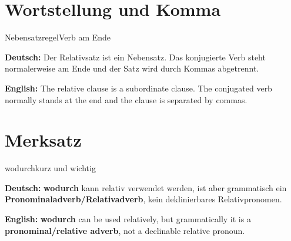 \documentclass[a4paper,11pt]{article}
\newcommand{\GermanText}[1]{\textbf{Deutsch: }#1\par}
\newcommand{\EnglishText}[1]{{\small\color{SoftGray}\textbf{English: }#1\par}}
\begin{document}
\section{Wortstellung und Komma}

\begin{grammarentry}{Nebensatzregel}{Verb am Ende}

\GermanText{Der Relativsatz ist ein Nebensatz. Das konjugierte Verb steht normalerweise am Ende und der Satz wird durch Kommas abgetrennt.}

\EnglishText{The relative clause is a subordinate clause. The conjugated verb normally stands at the end and the clause is separated by commas.}

\end{grammarentry}

\section{Merksatz}

\begin{grammarentry}{wodurch}{kurz und wichtig}

\GermanText{\textbf{wodurch} kann relativ verwendet werden, ist aber grammatisch ein \textbf{Pronominaladverb/Relativadverb}, kein deklinierbares Relativpronomen.}

\EnglishText{\textbf{wodurch} can be used relatively, but grammatically it is a \textbf{pronominal/relative adverb}, not a declinable relative pronoun.}

\end{grammarentry}
\end{document}
